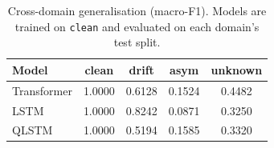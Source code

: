 \begin{table}[t]
\centering
\caption{Cross-domain generalisation (macro-F1). Models are trained on \texttt{clean} and evaluated on each domain's test split.}
\label{tab:cross-domain}
\begin{tabular}{lcccc}
\toprule
Model & clean & drift & asym & unknown \\
\midrule
Transformer & 1.0000 & 0.6128 & 0.1524 & 0.4482 \\
LSTM & 1.0000 & 0.8242 & 0.0871 & 0.3250 \\
QLSTM & 1.0000 & 0.5194 & 0.1585 & 0.3320 \\
\bottomrule
\end{tabular}
\end{table}
